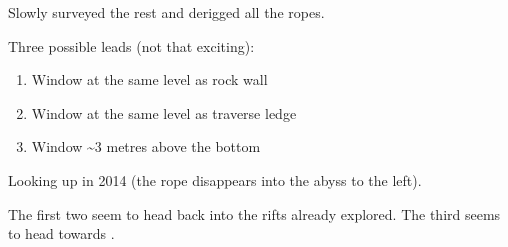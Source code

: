 Slowly surveyed the rest and derigged all the ropes.

Three possible leads (not that exciting):

\begin{enumerate}
\def\labelenumi{\arabic{enumi}.}
\item
  Window at the same level as rock wall
\item
  Window at the same level as traverse ledge
\item
  Window \textasciitilde 3 metres above the bottom
\end{enumerate}


\begin{marginfigure}
\checkoddpage \ifoddpage \forcerectofloat \else \forceversofloat \fi
\centering
 \caption{Looking up  in 2014 (the rope disappears into the abyss to the left). }
 \label{big rock candy mountain}
\end{marginfigure}


The first two seem to head back into the rifts already explored. The third seems to head towards .

